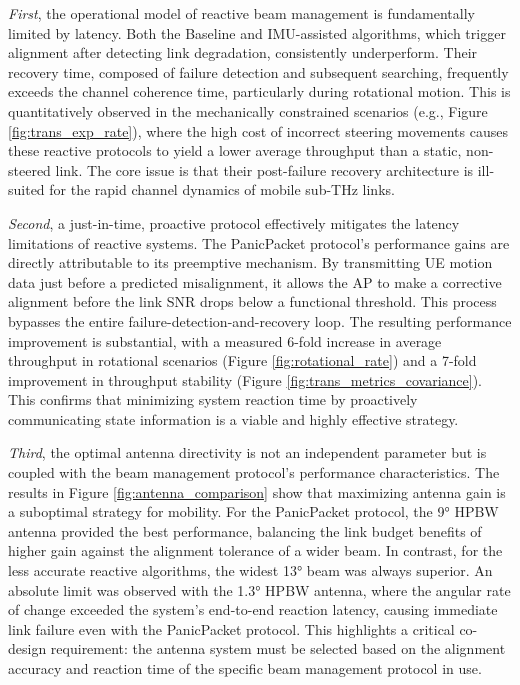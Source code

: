 \documentclass[fleqn,10pt]{wlscirep}
\begin{document}
\emph{First}, the operational model of reactive beam management is fundamentally limited by latency. Both the Baseline and IMU-assisted algorithms, which trigger alignment after detecting link degradation, consistently underperform. Their recovery time, composed of failure detection and subsequent searching, frequently exceeds the channel coherence time, particularly during rotational motion. This is quantitatively observed in the mechanically constrained scenarios (e.g., Figure \ref{fig:trans_exp_rate}), where the high cost of incorrect steering movements causes these reactive protocols to yield a lower average throughput than a static, non-steered link. The core issue is that their post-failure recovery architecture is ill-suited for the rapid channel dynamics of mobile sub-THz links.

\emph{Second}, a just-in-time, proactive protocol effectively mitigates the latency limitations of reactive systems. The PanicPacket protocol's performance gains are directly attributable to its preemptive mechanism. By transmitting UE motion data just before a predicted misalignment, it allows the AP to make a corrective alignment before the link SNR drops below a functional threshold. This process bypasses the entire failure-detection-and-recovery loop. The resulting performance improvement is substantial, with a measured 6-fold increase in average throughput in rotational scenarios (Figure \ref{fig:rotational_rate}) and a 7-fold improvement in throughput stability (Figure \ref{fig:trans_metrics_covariance}). This confirms that minimizing system reaction time by proactively communicating state information is a viable and highly effective strategy.

\emph{Third}, the optimal antenna directivity is not an independent parameter but is coupled with the beam management protocol's performance characteristics. The results in Figure \ref{fig:antenna_comparison} show that maximizing antenna gain is a suboptimal strategy for mobility. For the PanicPacket protocol, the 9° HPBW antenna provided the best performance, balancing the link budget benefits of higher gain against the alignment tolerance of a wider beam. In contrast, for the less accurate reactive algorithms, the widest 13° beam was always superior. An absolute limit was observed with the 1.3° HPBW antenna, where the angular rate of change exceeded the system's end-to-end reaction latency, causing immediate link failure even with the PanicPacket protocol. This highlights a critical co-design requirement: the antenna system must be selected based on the alignment accuracy and reaction time of the specific beam management protocol in use.
\end{document}
